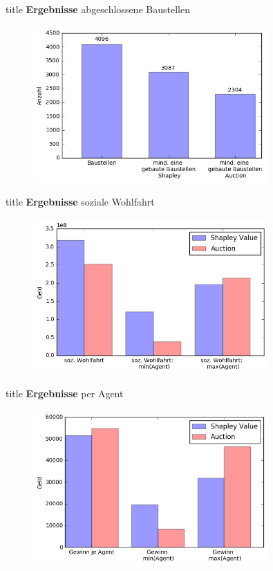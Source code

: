 \documentclass[c]{beamer}
\theoremstyle{break}
\begin{document}
  \begin{frame}{title}
    \textbf{Ergebnisse} abgeschlossene Baustellen
    \begin{figure}
      \centering
      \includegraphics[width=0.8\textwidth]{results3.png}
    \end{figure}
  \end{frame}


  \begin{frame}{title}
    \textbf{Ergebnisse} soziale Wohlfahrt
    \begin{figure}
      \centering
      \includegraphics[width=0.8\textwidth]{results.png}
    \end{figure}
  \end{frame}

  
  \begin{frame}{title}
    \textbf{Ergebnisse} per Agent
    \begin{figure}
      \centering
      \includegraphics[width=0.8\textwidth]{results2.png}
    \end{figure}
  \end{frame}
\end{document}
